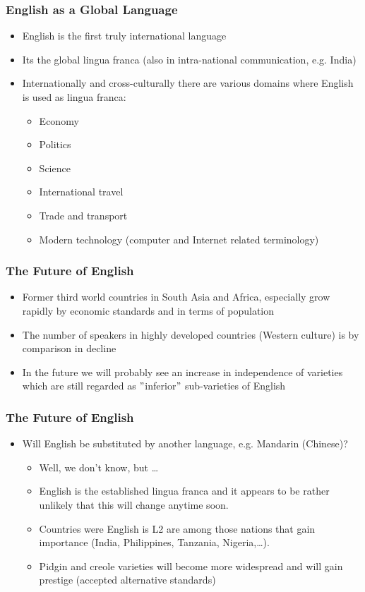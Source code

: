 \documentclass[12pt, table]{beamer}
\begin{document}
\begin{frame}
\frametitle{English as a Global Language}
\begin{itemize}
\item English is the first truly international language
\item Its the global lingua franca (also in intra-national communication, e.g. India)
\item Internationally and cross-culturally there are various domains where English is used as lingua franca:
\begin{itemize}
\item Economy 
\item Politics 
\item Science 
\item International travel 
\item Trade and transport 
\item Modern technology (computer and  Internet related terminology)
\end{itemize}
\end{itemize}
\end{frame}

\begin{frame}
\frametitle{The Future of English}
\begin{itemize}
\item Former third world countries in South Asia and Africa, especially grow rapidly by economic standards and in terms of population
\item The number of speakers in highly developed countries (Western culture) is by comparison in decline
\item In the future we will probably see an increase in independence of varieties which are still regarded as $"$inferior$"$ sub-varieties of English
\end{itemize}
\end{frame}

\begin{frame}
\frametitle{The Future of English}
\begin{itemize}
\item Will English be substituted by another language, e.g. Mandarin (Chinese)?
\begin{itemize}
\item Well, we don't know, but \dots
\item English is the established lingua franca and it appears to be rather unlikely that this will change anytime soon.
\item Countries were English is L2 are among those nations that gain importance (India, Philippines, Tanzania, Nigeria,\dots).
\item Pidgin and creole varieties will become more widespread and will gain prestige (accepted alternative standards)
\end{itemize}
\end{itemize}
\end{frame}
\end{document}
